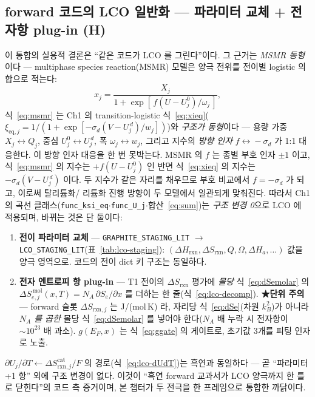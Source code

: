\documentclass[11pt,a4paper]{article}
\newcommand{\eq}{\mathrm{eq}}
\newcommand{\rxn}{\mathrm{rxn}}
\newcommand{\code}[1]{\texttt{#1}}
\begin{document}
\subsection{forward 코드의 LCO 일반화 — 파라미터 교체 + 전자항 plug-in (H)}\label{sec:lco-code}
이 통합의 실용적 결론은 ``같은 코드가 LCO 를 그린다''이다. 그 근거는 \emph{MSMR 동형}이다 — multiphase species
reaction(MSMR) 모델\cite{msmr2024}은 양극 전위를 전이별 logistic 의 합으로 적는다:
\begin{equation}
x_j=\frac{X_j}{1+\exp[\,f(U-U_j^0)/\omega_j\,]},
\label{eq:msmr}
\end{equation}
식~\eqref{eq:msmr} 는 Ch1 의 transition-logistic 식~\eqref{eq:xieq}($\xi_{\eq,j}=1/(1+\exp[-\sigma_d(V-U_j^{\,d})/w_j])$)와
\emph{구조가 동형}이다 — 용량 가중 $X_j\!\leftrightarrow\!Q_j$, 중심 $U_j^0\!\leftrightarrow\!U_j^{\,d}$, 폭 $\omega_j\!\leftrightarrow\!w_j$,
그리고 지수의 \emph{방향 인자} $f\!\leftrightarrow\!-\sigma_d$ 가 1:1 대응한다. 이 방향 인자 대응을 한 번 못박는다. MSMR 의
$f$ 는 종별 부호 인자 $\pm1$ 이고, 식~\eqref{eq:msmr} 의 지수는 $+f(U-U_j^0)$ 인 반면 식~\eqref{eq:xieq} 의 지수는
$-\sigma_d(V-U_j^{\,d})$ 이다. 두 지수가 같은 자리를 채우므로 부호 비교에서 $f=-\sigma_d$ 가 되고, 이로써 탈리튬화/
리튬화 진행 방향이 두 모델에서 일관되게 맞춰진다. 따라서 Ch1 의 곡선 클래스(\code{func\_ksi\_eq}$\cdot$\code{func\_U\_j}$\cdot$합산~\eqref{eq:sum})는
\emph{구조 변경 0}으로 LCO 에 적용되며, 바뀌는 것은 단 둘이다:
\begin{enumerate}[label=(\roman*),leftmargin=2.2em,itemsep=1pt]
\item \textbf{전이 파라미터 교체} — \code{GRAPHITE\_STAGING\_LIT} $\to$ \code{LCO\_STAGING\_LIT}(표~\ref{tab:lco-staging}):
$(\Delta H_\rxn,\Delta S_\rxn,Q,\Omega,\Delta H_a,\dots)$ 값을 양극 영역으로. 코드의 전이 dict 키 구조는 동일하다.
\item \textbf{전자 엔트로피 항 plug-in} — T1 전이의 $\Delta S_{\rxn}$ 평가에 \emph{몰당} 식~\eqref{eq:dSemolar} 의
$\Delta S_{e,j}^{\,\mathrm{mol}}(x,T)=N_A\,\partial S_e/\partial x$ 를 더하는 한 줄(식~\eqref{eq:lco-decomp}). \textbf{★단위 주의} —
forward 슬롯 $\Delta S_{\rxn,j}$ 는 J/(mol\,K) 라, 자리당 식~\eqref{eq:dSe}(차원 $k_B^2$)가 아니라 \emph{$N_A$ 를 곱한}
몰당 식~\eqref{eq:dSemolar} 를 넣어야 한다($N_A$ 배 누락 시 전자항이 $\sim10^{23}$ 배 과소). $g(E_F,x)$ 는
식~\eqref{eq:ggate} 의 게이트로, 초기값 3개를 피팅 인자로 노출.
\end{enumerate}
$\partial U_j/\partial T\leftarrow\Delta S_{\rxn,j}^\mathrm{cat}/F$ 의 경로(식~\eqref{eq:lco-dUdT})는 흑연과 동일하다 —
곧 ``파라미터 +1 항'' 외에 구조 변경이 없다. 이것이 ``흑연 forward 교과서가 LCO 양극까지 한 틀로 닫힌다''의 코드 측
증거이며, 본 챕터가 두 전극을 한 프레임으로 통합한 까닭이다.
\end{document}

